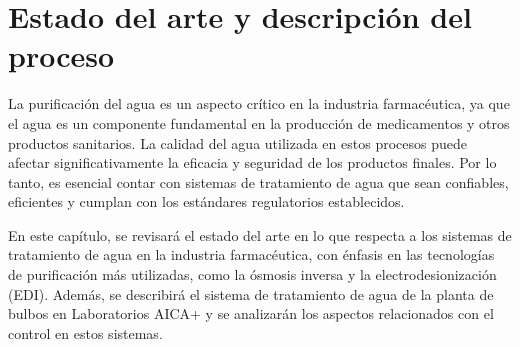\chapter{Estado del arte y descripción del proceso}
La purificación del agua es un aspecto crítico en la industria farmacéutica, ya que el agua es un componente
fundamental en la producción de medicamentos y otros productos sanitarios. La calidad del agua utilizada
en estos procesos puede afectar significativamente la eficacia y seguridad de los productos finales.
Por lo tanto, es esencial contar con sistemas de tratamiento de agua que sean confiables, eficientes y cumplan con los estándares regulatorios establecidos.

En este capítulo, se revisará el estado del arte en lo que respecta a los sistemas de tratamiento de
agua en la industria farmacéutica, con énfasis en las tecnologías de purificación más utilizadas, como la ósmosis inversa y la electrodesionización (EDI). Además,
se describirá el sistema de tratamiento de agua de la planta de bulbos en Laboratorios AICA+ y se analizarán los aspectos relacionados con el control en estos sistemas.



